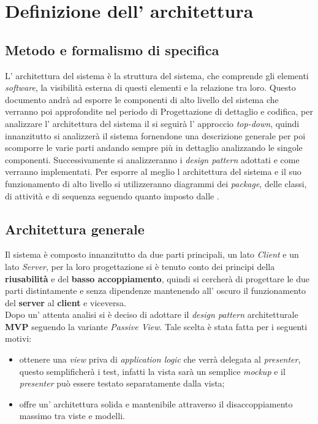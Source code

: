 \section{Definizione dell' architettura}
\subsection{Metodo e formalismo di specifica}
L' architettura del sistema è la struttura del sistema, che comprende gli elementi \textit{software}, la visibilità esterna di questi elementi e la relazione tra loro.
Questo documento andrà ad esporre le componenti di alto livello del sistema che verranno poi approfondite nel periodo di Progettazione di dettaglio e codifica, per analizzare l' architettura del sistema il \progetto si seguirà l' approccio \textit{top-down}, quindi innanzitutto si analizzerà il sistema fornendone una descrizione generale per poi scomporre le varie parti andando sempre più in dettaglio analizzando le singole componenti.
Successivamente si analizzeranno i \textit{design pattern} adottati e come verranno implementati.
Per esporre al meglio l architettura del sistema e il suo funzionamento di alto livello si utilizzeranno diagrammi dei \textit{package}, delle classi, di attività e di sequenza seguendo quanto imposto dalle \NormeDiProgetto{}.
\subsection{Architettura generale}
Il sistema \progetto{} è composto innanzitutto da due parti principali, un lato \textit{Client} e un lato \textit{Server}, per la loro progettazione si è tenuto conto dei principi della \textbf{riusabilità} e del \textbf{basso accoppiamento}, quindi si cercherà di progettare le due parti distintamente e senza dipendenze mantenendo all' oscuro il funzionamento del \textbf{server} al \textbf{client} e viceversa.\\
Dopo un' attenta analisi si è deciso di adottare il \textit{design pattern} architetturale \textbf{MVP} seguendo la variante \textit{Passive View}. Tale scelta è stata fatta per i seguenti motivi:
\begin{itemize}
	\item ottenere una \textit{view} priva di \textit{application logic} che verrà delegata al \textit{presenter}, questo semplificherà i test, infatti la vista sarà un semplice \textit{mockup} e il \textit{presenter} può essere testato separatamente dalla vista;
	\item offre un' architettura solida e mantenibile attraverso il disaccoppiamento massimo tra viste e modelli.
\end{itemize}
